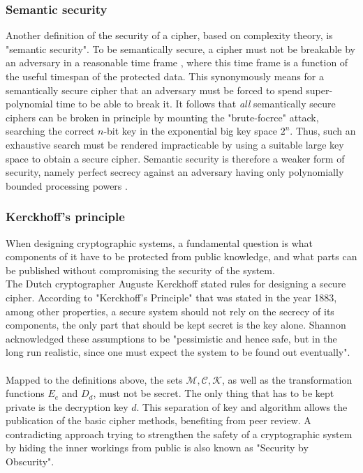 \subsubsection{Semantic security}

Another definition of the security of a cipher, based on complexity theory, is "semantic security".
To be semantically secure, a cipher must not be breakable by an adversary in a reasonable time
frame \cite{handbook1}, where this time frame is a function of the useful timespan of the protected data. This synonymously means for a semantically secure
cipher that an adversary must be forced to spend super-polynomial time to be able to break it. It follows that \textit{all} semantically secure ciphers
can be broken in principle by mounting the "brute-focrce" attack, searching the correct $n$-bit key in the exponential big key space $2^n$. Thus, such an
exhaustive search must be rendered impracticable by using a suitable large key space to obtain a secure cipher.
Semantic security is therefore a weaker form of security, namely perfect secrecy against an adversary having only polynomially bounded
processing powers \cite{GoldwasserMicali}.

\subsubsection{Kerckhoff's principle}
When designing cryptographic systems, a fundamental question is what components of it have to be protected from public knowledge, and what parts can be
published without compromising the security of the system. 
\\
The Dutch cryptographer Auguste Kerckhoff stated rules for designing a secure cipher.
According to "Kerckhoff's Principle" that was stated in the year 1883, among other properties, a secure system should not rely on the secrecy of
its components, the only part that should be kept secret is the key alone. Shannon acknowledged these assumptions to be "pessimistic and hence safe, but 
in the long run realistic, since one must expect the system to be found out eventually".
\\
\\
Mapped to the definitions above, the sets $\mathcal{M, C, K}$, as well as the
transformation functions $E_e$ and $D_d$, must not be secret. The only thing that has to be kept private is the decryption key $d$.
This separation of key and algorithm allows the publication of the basic cipher methods, benefiting from peer review. A contradicting approach 
trying to strengthen the safety of a cryptographic system by hiding the inner workings from public is also known as "Security by Obscurity".

